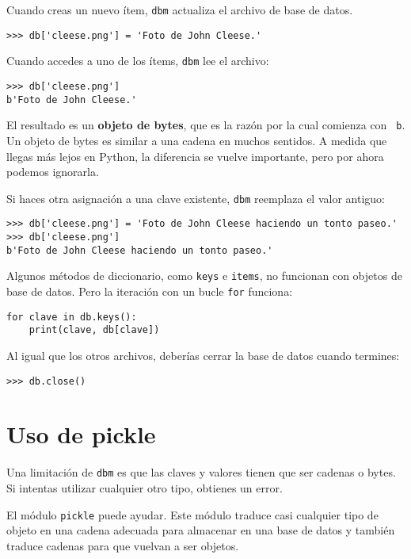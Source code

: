 \documentclass[10pt]{book}
\begin{document}
Cuando creas un nuevo ítem, {\tt dbm} actualiza el archivo de base de datos.

\begin{verbatim}
>>> db['cleese.png'] = 'Foto de John Cleese.'
\end{verbatim}
%
Cuando accedes a uno de los ítems, {\tt dbm} lee el archivo:

\begin{verbatim}
>>> db['cleese.png']
b'Foto de John Cleese.'
\end{verbatim}
%
El resultado es un {\bf objeto de bytes}, que es la razón por la cual comienza con {\tt
  b}.  Un objeto de bytes es similar a una cadena en muchos sentidos.  A medida que llegas más lejos en Python, la diferencia se vuelve importante, pero por ahora
podemos ignorarla.

Si haces otra asignación a una clave existente, {\tt dbm} reemplaza
el valor antiguo:

\begin{verbatim}
>>> db['cleese.png'] = 'Foto de John Cleese haciendo un tonto paseo.'
>>> db['cleese.png']
b'Foto de John Cleese haciendo un tonto paseo.'
\end{verbatim}
%

Algunos métodos de diccionario, como {\tt keys} e {\tt items}, no
funcionan con objetos de base de datos.  Pero la iteración con un bucle {\tt for}
funciona:

\begin{verbatim}
for clave in db.keys():
    print(clave, db[clave])
\end{verbatim}
%
Al igual que los otros archivos, deberías cerrar la base de datos cuando
termines:

\begin{verbatim}
>>> db.close()
\end{verbatim}
%


\section{Uso de pickle}

Una limitación de {\tt dbm} es que las claves y valores tienen que ser
cadenas o bytes.  Si intentas utilizar cualquier otro tipo, obtienes un error.
 

El módulo {\tt pickle} puede ayudar.  Este módulo traduce
casi cualquier tipo de objeto en una cadena adecuada para almacenar
en una base de datos y también traduce cadenas para que vuelvan a ser objetos.
\end{document}
